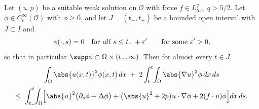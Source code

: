 \documentclass[11pt,reqno]{amsart}
\begin{document}
\begin{lemma}\label{lem:lei-pointwise}
Let $(u,p)$ be a suitable weak solution on $\mathcal{O}$ with force
$f\in L^{q}_{loc}$, $q>5/2$. Let $\phi\in C_{c}^{\infty}(\mathcal{O})$
with $\phi\ge0$, and let $J=(t_{-},t_{+})$ be a bounded open interval with
$\overline{J}\subset I$ and
\begin{equation}\label{eq:phi-vanishes}
  \phi(\cdot,s)=0\quad\text{for \emph{all} }s\le t_{-}+\varepsilon'
  \qquad\text{for some }\varepsilon'>0 ,
\end{equation}
so that in particular $\supp\phi\subset\Omega\times(t_{-},\infty)$. Then for
almost every $t\in J$,
\begin{multline}\label{eq:lei-pointwise}
  \int_{\Omega}\abs{u(x,t)}^{2}\phi(x,t)\,dx
  \;+\;2\int_{t_{-}}^{t}\!\!\int_{\Omega}\abs{\nabla u}^{2}\phi\,dx\,ds\\
  \le\;\int_{t_{-}}^{t}\!\!\int_{\Omega}
    \Bigl[\abs{u}^{2}\bigl(\partial_{s}\phi+\Delta\phi\bigr)
      +\bigl(\abs{u}^{2}+2p\bigr)u\cdot\nabla\phi
      +2(f\cdot u)\phi\Bigr]dx\,ds .
\end{multline}
\end{lemma}
\end{document}
